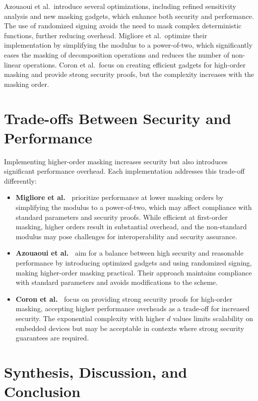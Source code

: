 Azouaoui et al.\ introduce several optimizations, including refined sensitivity analysis and new masking gadgets, which enhance both security and performance. The use of randomized signing avoids the need to mask complex deterministic functions, further reducing overhead. Migliore et al.\ optimize their implementation by simplifying the modulus to a power-of-two, which significantly eases the masking of decomposition operations and reduces the number of non-linear operations. Coron et al.\ focus on creating efficient gadgets for high-order masking and provide strong security proofs, but the complexity increases with the masking order.
\newpage

\section{Trade-offs Between Security and Performance}

Implementing higher-order masking increases security but also introduces significant performance overhead. Each implementation addresses this trade-off differently:

\begin{itemize}
    \item \textbf{Migliore et al.~\cite{Migliore19}} prioritize performance at lower masking orders by simplifying the modulus to a power-of-two, which may affect compliance with standard parameters and security proofs. While efficient at first-order masking, higher orders result in substantial overhead, and the non-standard modulus may pose challenges for interoperability and security assurance.
    \item \textbf{Azouaoui et al.~\cite{Azouaoui22}} aim for a balance between high security and reasonable performance by introducing optimized gadgets and using randomized signing, making higher-order masking practical. Their approach maintains compliance with standard parameters and avoids modifications to the scheme.
    \item \textbf{Coron et al.~\cite{Coron23}} focus on providing strong security proofs for high-order masking, accepting higher performance overheads as a trade-off for increased security. The exponential complexity with higher $d$ values limits scalability on embedded devices but may be acceptable in contexts where strong security guarantees are required.
\end{itemize}

\section{Synthesis, Discussion, and Conclusion}

